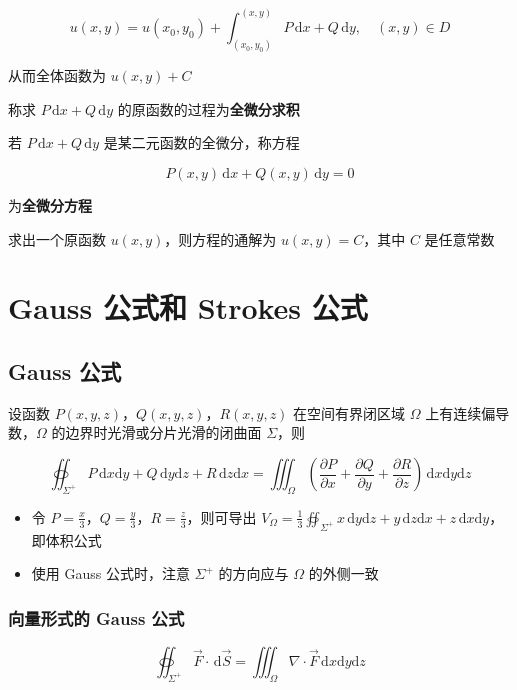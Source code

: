 \documentclass[lang = zh , final , oneside , openany , titlepage , zihao = -4 , linespread = 1.3 , baselineskip = false , cjk-font = windows , text-font = newtx , math-font = newtx]{sjtureport}
\begin{document}
\[u(x,y) = u(x_0,y_0) + \int_{(x_0,y_0)}^{(x,y)} P\,\mathrm{d}x +Q\,\mathrm{d}y,\quad (x,y)\in D\]

从而全体函数为 \(u(x,y) + C\)

称求 \(P\,\mathrm{d}x +Q\,\mathrm{d}y\)
的原函数的过程为\textbf{全微分求积}

若 \(P\,\mathrm{d}x +Q\,\mathrm{d}y\) 是某二元函数的全微分，称方程

\[P(x,y)\,\mathrm{d}x +Q(x,y)\,\mathrm{d}y = 0\]

为\textbf{全微分方程}

求出一个原函数 \(u(x,y)\)，则方程的通解为 \(u(x,y) = C\)，其中 \(C\)
是任意常数

\section{Gauss 公式和 Strokes 公式}

\subsection{Gauss 公式}

\begin{theorem}
    设函数 \(P(x,y,z)\)，\(Q(x,y,z)\)，\(R(x,y,z)\) 在空间有界闭区域
\(\Omega\) 上有连续偏导数，\(\Omega\) 的边界时光滑或分片光滑的闭曲面
\(\Sigma\)，则

\[\oiint_{\Sigma^+} P\,\mathrm{d}x\mathrm{d}y + Q\,\mathrm{d}y\mathrm{d}z + R\,\mathrm{d}z\mathrm{d}x = \iiint_\Omega \left(\frac{\partial P}{\partial x} + \frac{\partial Q}{\partial y} + \frac{\partial R}{\partial z}\right)\,\mathrm{d}x\mathrm{d}y\mathrm{d}z\]
\end{theorem}

\begin{itemize}
\item
  令 \(P=\frac{x}{3}\)，\(Q=\frac{y}{3}\)，\(R=\frac{z}{3}\)，则可导出
  \(\displaystyle V_\Omega = \frac{1}{3}\oiint_{\Sigma^+} x\,\mathrm{d}y\mathrm{d}z + y\,\mathrm{d}z\mathrm{d}x + z\,\mathrm{d}x\mathrm{d}y\)，即体积公式
\item
  使用 Gauss 公式时，注意 \(\Sigma^+\) 的方向应与 \(\Omega\) 的外侧一致
\end{itemize}

\subsubsection{向量形式的 Gauss 公式}

\[\oiint_{\Sigma^+} \vec{F}\cdot\,\mathrm{d}\vec{S} = \iiint_\Omega \nabla\cdot\vec{F}\,\mathrm{d}x\mathrm{d}y\mathrm{d}z\]
\end{document}
